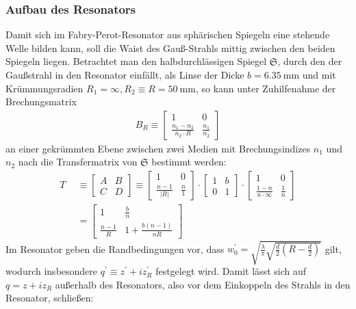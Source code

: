 \documentclass[11pt,a4paper,oneside]{scrartcl}
\begin{document}
\subsubsection{Aufbau des Resonators}
Damit sich im Fabry-Perot-Resonator aus sphärischen Spiegeln eine stehende Welle bilden kann, soll die Waist des Gauß-Strahls mittig zwischen den beiden Spiegeln liegen. Betrachtet man den halbdurchlässigen Spiegel $\mathfrak{S}$, durch den der Gaußstrahl in den Resonator einfällt, als Linse der Dicke $b=6.35\ \mathrm{mm}$ und mit Krümmungsradien $R_1=\infty,R_2\equiv R=50\ \mathrm{mm}$, so kann unter Zuhilfenahme der Brechungsmatrix 
\begin{align}
B_R\equiv \begin{bmatrix}
1 & 0\\
\frac{n_1-n_2}{n_2\cdot R} & \frac{n_1}{n_2}
\end{bmatrix} 
\end{align}
an einer gekrümmten Ebene zwischen zwei Medien mit Brechungsindizes $n_1$ und $n_2$
nach \cite{dewiki:225621757} die Transfermatrix von $\mathfrak{S}$ bestimmt werden:
\begin{align}
T & \equiv
\begin{bmatrix}
A & B\\
C & D 
\end{bmatrix} 
\equiv
\begin{bmatrix}
1 & 0\\
\frac{n-1}{|R|} & \frac{n}{1}
\end{bmatrix} 
\cdot
\begin{bmatrix}
1 & b\\
0 & 1
\end{bmatrix} 
\cdot
\begin{bmatrix}
1 & 0\\
\frac{1-n}{n\cdot \infty} & \frac{1}{n}
\end{bmatrix} 
\\ \quad& = \begin{bmatrix}
1 & \frac{b}{n}\\
\frac{n-1}{R} & 1+\frac{b(n-1)}{nR}
\end{bmatrix}
\end{align}
Im Resonator geben die Randbedingungen vor, dass $w_0^\prime=\sqrt{\frac{\lambda}{\pi}\sqrt{\frac{d}{2}\left(R-\frac{d}{2}\right)}}$ gilt, wodurch insbesondere $q^\prime\equiv z^\prime+iz_R^\prime$ festgelegt wird. Damit lässt sich auf $q=z+iz_R$ außerhalb des Resonators, also vor dem Einkoppeln des Strahls in den Resonator, schließen:
\end{document}
